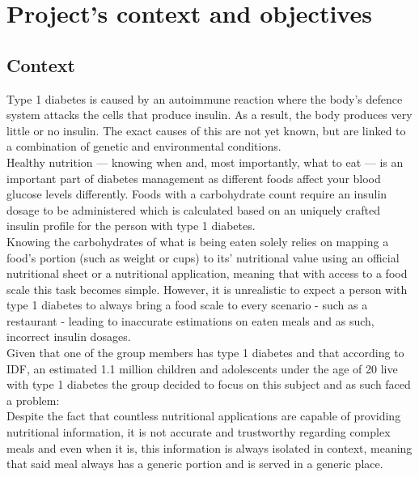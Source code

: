 \chapter{Project's context and objectives}

\section{Context}

Type 1 diabetes is caused by an autoimmune reaction where the body’s defence system attacks the cells that produce insulin. 
As a result, the body produces very little or no insulin. 
The exact causes of this are not yet known, but are linked to a combination of genetic and environmental conditions.
\cite{idf}\\

Healthy nutrition — knowing when and, most importantly, what to eat — is an important part of 
diabetes management as different foods affect your blood glucose levels differently. Foods with a 
carbohydrate count require an insulin dosage to be administered which is calculated based 
on an uniquely crafted insulin profile for the person with type 1 diabetes.\\

Knowing the carbohydrates of what is being eaten solely relies on mapping a food's portion (such as weight or cups) to its' nutritional 
value using an official nutritional sheet \cite{mellitus} or a nutritional application, 
meaning that with access to a food scale this task becomes simple. However, it is unrealistic to expect a person with type 1 diabetes
to always bring a food scale to every scenario - such as a restaurant - leading to inaccurate estimations on eaten meals and as such,
incorrect insulin dosages.\\

Given that one of the group members has type 1 diabetes and that according to IDF, an estimated 1.1 million children and adolescents under the age of 20 
live with type 1 diabetes \cite{idfatlas} the group decided to focus on this subject
and as such faced a problem:\\ 

Despite the fact that countless nutritional applications are capable of providing nutritional information, it is not  
accurate and trustworthy regarding complex meals and even when it is, this information is always isolated in context, 
meaning that said meal always has a generic portion and is served in a generic place.\\


